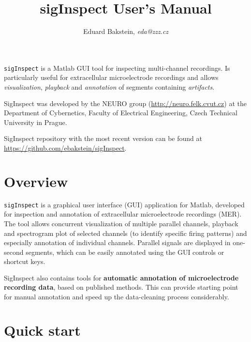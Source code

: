 \documentclass[a4paper,10pt]{article}
\title{sigInspect User's Manual}
\author{Eduard Bakstein, \emph{eda@zzz.cz}}
\begin{document}
\maketitle

\begin{center}
\begin{minipage}{.75\linewidth}

\verb|sigInspect| is a Matlab GUI tool for inspecting multi-channel recordings. Is particularly useful for extracellular microelectrode recordings and allows \emph{visualization}, \emph{playback} and \emph{annotation} of segments containing \emph{artifacts}.

SigInspect was developed by the NEURO group (\url{http://neuro.felk.cvut.cz}) at the Department of Cybernetics, Faculty of Electrical Engineering, Czech Technical University in Prague. 

SigInspect repository with the most recent version can be found at \url{https://github.com/ebakstein/sigInspect}.
	
\end{minipage}
\end{center}

\tableofcontents
\vspace{1.5em}
\section{Overview}
\verb|sigInspect| is a graphical user interface (GUI) application for Matlab, developed for inspection and annotation of extracellular microelectrode recordings (MER). The tool allows concurrent visualization of multiple parallel channels, playback and spectrogram plot of selected channels (to identify specific firing patterns) and especially annotation of individual channels. Parallel signals are displayed in one-second segments, which can be easily annotated using the GUI controls or shortcut keys.

SigInspect also contains tools for \textbf{automatic annotation of microelectrode recording data}, based on published methods. This can provide starting point for manual annotation and speed up the data-cleaning process considerably.

\newpage

\section{Quick start}
\end{document}
